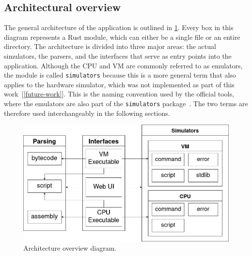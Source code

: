
\subsection{Architectural overview}
The general architecture of the application is outlined in \cref{fig:arch}.
Every box in this diagram represents a Rust module, which can either be a single file or an entire directory.
The architecture is divided into three major areas: the actual simulators, the parsers, and the interfaces that serve as entry points into the application.
Although the CPU and VM are commonly referred to as emulators, the module is called \verb+simulators+ because this is a more general term that also applies to the hardware simulator, which was not implemented as part of this work~[\ref{future-work}].
This is the naming convention used by the official tools, where the emulators are also part of the \verb+simulators+ package~\cite{n2tsimulators}.
The two terms are therefore used interchangeably in the following sections.

\begin{center}
  \begin{figure}[ht]
    \centering
    \includegraphics[width=12cm]{fig/architecture.png}
    \caption{Architecture overview diagram.}%
    \label{fig:arch}
  \end{figure}
\end{center}

